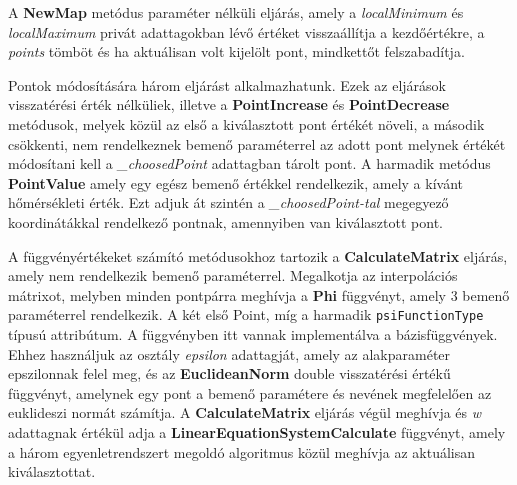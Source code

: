 			A \textbf{NewMap} metódus paraméter nélküli eljárás, amely a \textit{localMinimum} és \textit{localMaximum} privát adattagokban lévő értéket visszaállítja a kezdőértékre, a \textit{points} tömböt és ha aktuálisan volt kijelölt pont, mindkettőt felszabadítja.
			
			Pontok módosítására három eljárást alkalmazhatunk. Ezek az eljárások visszatérési érték nélküliek, illetve a \textbf{PointIncrease} és \textbf{PointDecrease} metódusok, melyek közül az első a kiválasztott pont értékét növeli, a második csökkenti, nem rendelkeznek bemenő paraméterrel az adott pont melynek értékét módosítani kell a \textit{\_choosedPoint} adattagban tárolt pont. A harmadik metódus \textbf{PointValue} amely egy egész bemenő értékkel rendelkezik, amely a kívánt hőmérsékleti érték. Ezt adjuk át szintén a \textit{\_choosedPoint-tal} megegyező koordinátákkal rendelkező pontnak, amennyiben van kiválasztott pont.
			
			A függvényértékeket számító metódusokhoz tartozik a \textbf{CalculateMatrix} eljárás, amely nem rendelkezik bemenő paraméterrel. Megalkotja az interpolációs mátrixot, melyben minden pontpárra meghívja a \textbf{Phi} függvényt, amely 3 bemenő paraméterrel rendelkezik. A két első Point, míg a harmadik \texttt{psiFunctionType} típusú attribútum. A függvényben itt vannak implementálva a bázisfüggvények. Ehhez használjuk az osztály \textit{epsilon} adattagját, amely az alakparaméter epszilonnak felel meg, és az \textbf{EuclideanNorm} double visszatérési értékű függvényt, amelynek egy pont a bemenő paramétere és nevének megfelelően az euklideszi normát számítja. A \textbf{CalculateMatrix} eljárás végül meghívja és \textit{w} adattagnak értékül adja a \textbf{LinearEquationSystemCalculate} függvényt, amely a három egyenletrendszert megoldó algoritmus közül meghívja az aktuálisan kiválasztottat. 
			

